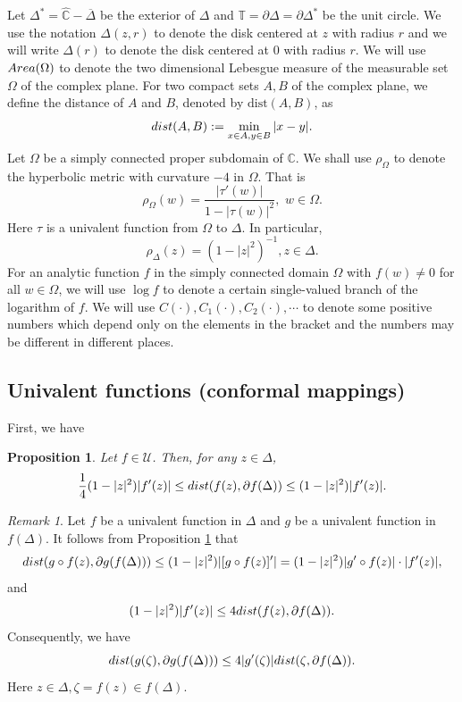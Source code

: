 \documentclass[11pt]{amsart}
\newtheorem{proposition}[theorem]{Proposition}
\theoremstyle{remark}
\newtheorem{remark}[theorem]{Remark}
\theoremstyle{claim}
\theoremstyle{definition}
\theoremstyle{problem}
\theoremstyle{conjecture}
\theoremstyle{question}
\numberwithin{equation}{section}
\begin{document}
Let $\Delta^{*}=\widehat{\mathbb{C}}-\overline{\Delta}$ be the
exterior of $\Delta$ and
$\mathbb{T}=\partial\Delta=\partial\Delta^{*}$ be the unit circle. We use the notation $\Delta(z,r)$ to denote the disk centered at $z$ with radius $r$ and we will write $\Delta(r)$ to denote the disk centered at $0$ with radius $r$. We will use ${\textup{Area}}(\Omega)$ to denote the two dimensional Lebesgue measure of the measurable set $\Omega$ of the complex plane. For two compact sets $A, B$ of the complex plane, we define the distance of  $A$ and $B$, denoted by ${\text{dist}}(A, B)$, as
\begin{equation}
{\textup{dist}}(A, B):=\min_{x\in A, y\in B}|x-y|. \nonumber
\end{equation}
Let $\Omega$ be a simply connected proper subdomain of $\mathbb{C}$.  We shall use $\rho_{\Omega}$ to denote the hyperbolic metric with curvature $-4$ in $\Omega$.  That is 
$$\rho_{\Omega}(w)=\frac{|\tau'(w)|}{1-|\tau(w)|^2},\,\, w\in \Omega.$$
Here $\tau$ is a univalent function from $\Omega$ to $\Delta$.  In particular, $$\rho_{\Delta}(z)=(1-|z|^2)^{-1}, z\in \Delta.$$ 
For an analytic function $f$ in the simply connected domain $\Omega$ with $f(w)\neq 0$ for all $w\in \Omega$, we will use $\log f$ to denote a certain single-valued branch of the logarithm of $f$. We will use $C(\cdot), C_{1}(\cdot), C_{2}(\cdot),\cdots$ to denote some positive numbers which depend only on the elements in the bracket and the numbers may be different in different places. 

\subsection{Univalent functions (conformal mappings)} First, we have
\begin{proposition}\label{pro-1}
Let $f\in \mathcal{U}$. Then, for any $z\in \Delta$,
\begin{equation} \frac{1}{4}(1-|z|^2)|f'(z)|\leq  {\textup{dist}}(f(z), \partial f(\Delta))\leq (1-|z|^2)|f'(z)|. \nonumber \end{equation}
\end{proposition}
\begin{remark}\label{re-1}
Let $f$ be a univalent function in $\Delta$ and $g$ be a univalent function in $f(\Delta)$. It follows from Proposition \ref{pro-1} that
\begin{equation}
{\textup{dist}}(g\circ f(z), \partial g(f(\Delta))) \leq (1-|z|^2)|[g\circ f(z)]'|= (1-|z|^2)|g'\circ f(z)|\cdot |f'(z)|, \nonumber
\end{equation}
and
\begin{equation}
(1-|z|^2)|f'(z)|\leq 4{\textup{dist}}(f(z), \partial f(\Delta)).\nonumber \end{equation}
Consequently, we have
$${\textup{dist}}(g(\zeta), \partial g(f(\Delta))) \leq 4 |g'(\zeta)|{\textup{dist}}(\zeta, \partial f(\Delta)).$$
Here $z\in \Delta, \zeta=f(z)\in f(\Delta).$
\end{remark}
\end{document}
